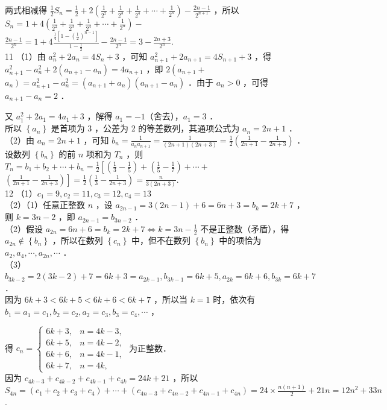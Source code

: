 \documentclass[10pt]{article}
\begin{document}
两式相减得 \(\frac{1}{2} S_{n}=\frac{1}{2}+2\left(\frac{1}{2^{2}}+\frac{1}{2^{3}}+\frac{1}{2^{4}}+\cdots+\frac{1}{2^{n}}\right)-\frac{2 n-1}{2^{n+1}}\) ，所以 \(S_{n}=1+4\left(\frac{1}{2^{2}}+\frac{1}{2^{3}}+\frac{1}{2^{4}}+\cdots+\frac{1}{2^{n}}\right)-\)\\
\(\frac{2 n-1}{2^{n}}=1+4 \frac{\frac{1}{4}\left[1-\left(\frac{1}{2}\right)^{n-1}\right]}{1-\frac{1}{2}}-\frac{2 n-1}{2^{n}}=3-\frac{2 n+3}{2^{n}}\).\\
11 （1）由 \(a_{n}^{2}+2 a_{n}=4 S_{n}+3\) ，可知 \(a_{n+1}^{2}+2 a_{n+1}=4 S_{n+1}+3\) ，得 \(a_{n+1}^{2}-a_{n}^{2}+2\left(a_{n+1}-a_{n}\right)=4 a_{n+1}\) ，即 \(2\left(a_{n+1}+\right.\) \(\left.a_{n}\right)=a_{n+1}^{2}-a_{n}^{2}=\left(a_{n+1}+a_{n}\right)\left(a_{n+1}-a_{n}\right)\) ．由于 \(a_{n}>0\) ，可得 \(a_{n+1}-a_{n}=2\) ．

又 \(a_{1}^{2}+2 a_{1}=4 a_{1}+3\) ，解得 \(a_{1}=-1\)（舍去），\(a_{1}=3\) ．\\
所以 \(\left\{a_{n}\right\}\) 是首项为 3 ，公差为 2 的等差数列，其通项公式为 \(a_{n}=2 n+1\) ．\\
（2）由 \(a_{n}=2 n+1\) ，可知 \(b_{n}=\frac{1}{a_{n} a_{n+1}}=\frac{1}{(2 n+1)(2 n+3)}=\frac{1}{2}\left(\frac{1}{2 n+1}-\frac{1}{2 n+3}\right)\) ．\\
设数列 \(\left\{b_{n}\right\}\) 的前 \(n\) 项和为 \(T_{n}\) ，则 \(T_{n}=b_{1}+b_{2}+\cdots+b_{n}=\frac{1}{2}\left[\left(\frac{1}{3}-\frac{1}{5}\right)+\left(\frac{1}{5}-\frac{1}{7}\right)+\cdots+\right.\) \(\left.\left(\frac{1}{2 n+1}-\frac{1}{2 n+3}\right)\right]=\frac{1}{2}\left(\frac{1}{3}-\frac{1}{2 n+3}\right)=\frac{n}{3(2 n+3)}\).\\
12 （1）\(c_{1}=9, c_{2}=11, c_{3}=12, c_{4}=13\)\\
（2）（1）任意正整数 \(n\) ，设 \(a_{2 n-1}=3(2 n-1)+6=6 n+3=b_{k}=2 k+7\) ，则 \(k=3 n-2\) ，即 \(a_{2 n-1}=b_{3 n-2}\) ．\\
（2）假设 \(a_{2 n}=6 n+6=b_{k}=2 k+7 \Leftrightarrow k=3 n-\frac{1}{2}\) 不是正整数（矛盾），得 \(a_{2 n} \notin\left\{b_{n}\right\}\) ，所以在数列 \(\left\{c_{n}\right\}\) 中，但不在数列 \(\left\{b_{n}\right\}\) 中的项恰为 \(a_{2}, a_{4}, \cdots, a_{2 n}, \cdots\) ．\\
（3）\(b_{3 k-2}=2(3 k-2)+7=6 k+3=a_{2 k-1}, b_{3 k-1}=6 k+5, a_{2 k}=6 k+6, b_{3 k}=6 k+7\) ．\\
因为 \(6 k+3<6 k+5<6 k+6<6 k+7\) ，所以当 \(k=1\) 时，依次有 \(b_{1}=a_{1}=c_{1}, b_{2}=c_{2}, a_{2}=c_{3}, b_{3}=c_{4}, \cdots\) ，

得 \(c_{n}=\left\{\begin{array}{ll}6 k+3, & n=4 k-3, \\ 6 k+5, & n=4 k-2, \\ 6 k+6, & n=4 k-1, \\ 6 k+7, & n=4 k,\end{array}\right.\) 为正整数．\\
因为 \(c_{4 k-3}+c_{4 k-2}+c_{4 k-1}+c_{4 k}=24 k+21\) ，所以\\
\(S_{4 n}=\left(c_{1}+c_{2}+c_{3}+c_{4}\right)+\cdots+\left(c_{4 n-3}+c_{4 n-2}+c_{4 n-1}+c_{4 n}\right)=24 \times \frac{n(n+1)}{2}+21 n=12 n^{2}+33 n\).
\end{document}
